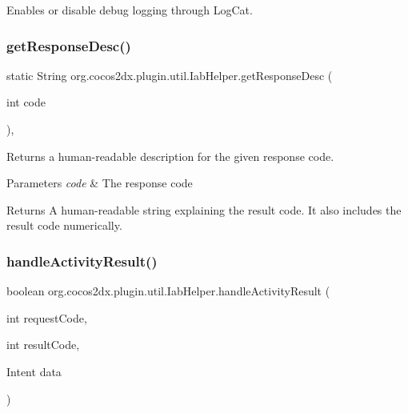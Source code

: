 Enables or disable debug logging through Log\+Cat. \mbox{\label{classorg_1_1cocos2dx_1_1plugin_1_1util_1_1IabHelper_a96fb9ce0f62a2601f6ee158ec45a96d5}} 
\subsubsection{\texorpdfstring{get\+Response\+Desc()}{getResponseDesc()}}
{\footnotesize\ttfamily static String org.\+cocos2dx.\+plugin.\+util.\+Iab\+Helper.\+get\+Response\+Desc (\begin{DoxyParamCaption}\item[{int}]{code }\end{DoxyParamCaption})\hspace{0.3cm}{\ttfamily [inline]}, {\ttfamily [static]}}

Returns a human-\/readable description for the given response code.


\begin{DoxyParams}{Parameters}
{\em code} & The response code \\
\hline
\end{DoxyParams}
\begin{DoxyReturn}{Returns}
A human-\/readable string explaining the result code. It also includes the result code numerically. 
\end{DoxyReturn}
\mbox{\label{classorg_1_1cocos2dx_1_1plugin_1_1util_1_1IabHelper_af0723c16bd0dfe7d7037d2b28e80ff29}} 
\subsubsection{\texorpdfstring{handle\+Activity\+Result()}{handleActivityResult()}}
{\footnotesize\ttfamily boolean org.\+cocos2dx.\+plugin.\+util.\+Iab\+Helper.\+handle\+Activity\+Result (\begin{DoxyParamCaption}\item[{int}]{request\+Code,  }\item[{int}]{result\+Code,  }\item[{Intent}]{data }\end{DoxyParamCaption})\hspace{0.3cm}{\ttfamily [inline]}}

